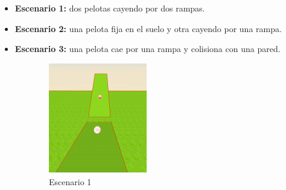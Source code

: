 \begin{itemize}
    \item \textbf{Escenario 1:} dos pelotas cayendo por dos rampas.
    \item \textbf{Escenario 2:} una pelota fija en el suelo y otra cayendo por una rampa.
    \item \textbf{Escenario 3:} una pelota cae por una rampa y colisiona con una pared.
\end{itemize}

\begin{figure}[!h]
  \begin{subfigure}[b]{0.3\textwidth}
    \includegraphics[width=\textwidth, height=\textwidth]{colision1.png}
    \caption{Escenario 1}
  \end{subfigure}
  \hfill
  \begin{subfigure}[b]{0.3\textwidth}

\end{subfigure}
\end{figure}
